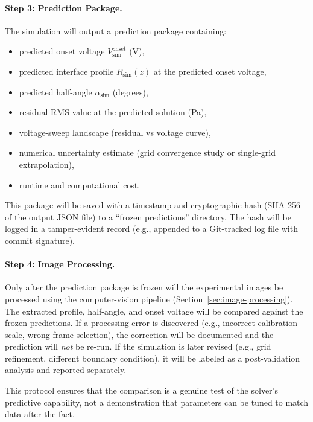 \paragraph{Step 3: Prediction Package.} The simulation will output a prediction package containing:
\begin{itemize}
    \item predicted onset voltage $V_{\mathrm{sim}}^{\mathrm{onset}}$ (V),
    \item predicted interface profile $R_{\mathrm{sim}}(z)$ at the predicted onset voltage,
    \item predicted half-angle $\alpha_{\mathrm{sim}}$ (degrees),
    \item residual RMS value at the predicted solution (\si{Pa}),
    \item voltage-sweep landscape (residual vs voltage curve),
    \item numerical uncertainty estimate (grid convergence study or single-grid extrapolation),
    \item runtime and computational cost.
\end{itemize}
This package will be saved with a timestamp and cryptographic hash (SHA-256 of the output JSON file) to a ``frozen predictions'' directory. The hash will be logged in a tamper-evident record (e.g., appended to a Git-tracked log file with commit signature).

\paragraph{Step 4: Image Processing.} Only after the prediction package is frozen will the experimental images be processed using the computer-vision pipeline (Section~\ref{sec:image-processing}). The extracted profile, half-angle, and onset voltage will be compared against the frozen predictions. If a processing error is discovered (e.g., incorrect calibration scale, wrong frame selection), the correction will be documented and the prediction will \emph{not} be re-run. If the simulation is later revised (e.g., grid refinement, different boundary condition), it will be labeled as a post-validation analysis and reported separately.

This protocol ensures that the comparison is a genuine test of the solver's predictive capability, not a demonstration that parameters can be tuned to match data after the fact.
